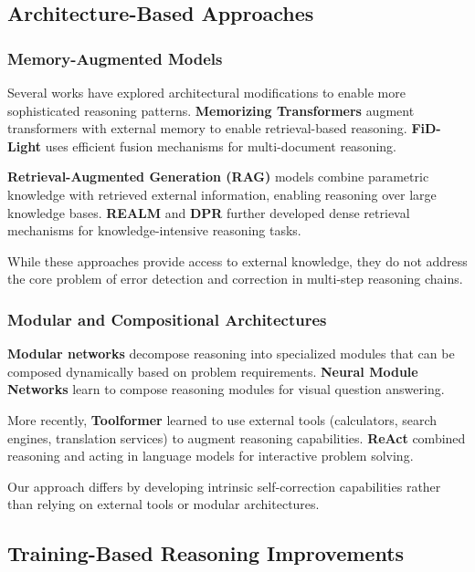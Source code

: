 \documentclass[10pt,twocolumn]{article}
\begin{document}
\subsection{Architecture-Based Approaches}

\subsubsection{Memory-Augmented Models}

Several works have explored architectural modifications to enable more sophisticated reasoning patterns. \textbf{Memorizing Transformers} \cite{wu2022memorizing} augment transformers with external memory to enable retrieval-based reasoning. \textbf{FiD-Light} \cite{hofstätter2023fid} uses efficient fusion mechanisms for multi-document reasoning.

\textbf{Retrieval-Augmented Generation (RAG)} \cite{lewis2020retrieval} models combine parametric knowledge with retrieved external information, enabling reasoning over large knowledge bases. \textbf{REALM} \cite{guu2020retrieval} and \textbf{DPR} \cite{karpukhin2020dense} further developed dense retrieval mechanisms for knowledge-intensive reasoning tasks.

While these approaches provide access to external knowledge, they do not address the core problem of error detection and correction in multi-step reasoning chains.

\subsubsection{Modular and Compositional Architectures}

\textbf{Modular networks} \cite{andreas2016neural} decompose reasoning into specialized modules that can be composed dynamically based on problem requirements. \textbf{Neural Module Networks} \cite{hu2017learning} learn to compose reasoning modules for visual question answering.

More recently, \textbf{Toolformer} \cite{schick2023toolformer} learned to use external tools (calculators, search engines, translation services) to augment reasoning capabilities. \textbf{ReAct} \cite{yao2023react} combined reasoning and acting in language models for interactive problem solving.

Our approach differs by developing intrinsic self-correction capabilities rather than relying on external tools or modular architectures.

\subsection{Training-Based Reasoning Improvements}
\end{document}
